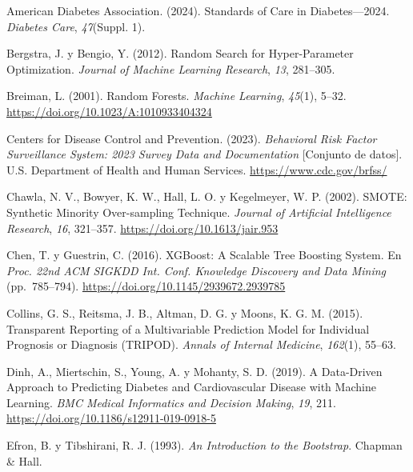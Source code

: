 \documentclass[conference,a4paper]{IEEEtran}
\begin{document}
\renewcommand{\refname}{Referencias}
\begin{thebibliography}{}
American Diabetes Association. (2024). Standards of Care in Diabetes---2024. \textit{Diabetes Care}, \textit{47}(Suppl. 1).

Bergstra, J. y Bengio, Y. (2012). Random Search for Hyper-Parameter Optimization. \textit{Journal of Machine Learning Research}, \textit{13}, 281–305.

Breiman, L. (2001). Random Forests. \textit{Machine Learning}, \textit{45}(1), 5–32. \url{https://doi.org/10.1023/A:1010933404324}

Centers for Disease Control and Prevention. (2023). \textit{Behavioral Risk Factor Surveillance System: 2023 Survey Data and Documentation} [Conjunto de datos]. U.S. Department of Health and Human Services. \url{https://www.cdc.gov/brfss/}

Chawla, N. V., Bowyer, K. W., Hall, L. O. y Kegelmeyer, W. P. (2002). {SMOTE}: Synthetic Minority Over-sampling Technique. \textit{Journal of Artificial Intelligence Research}, \textit{16}, 321–357. \url{https://doi.org/10.1613/jair.953}

Chen, T. y Guestrin, C. (2016). {XGBoost}: A Scalable Tree Boosting System. En \textit{Proc. 22nd ACM SIGKDD Int. Conf. Knowledge Discovery and Data Mining} (pp.~785–794). \url{https://doi.org/10.1145/2939672.2939785}

Collins, G. S., Reitsma, J. B., Altman, D. G. y Moons, K. G. M. (2015). Transparent Reporting of a Multivariable Prediction Model for Individual Prognosis or Diagnosis ({TRIPOD}). \textit{Annals of Internal Medicine}, \textit{162}(1), 55–63.

Dinh, A., Miertschin, S., Young, A. y Mohanty, S. D. (2019). A Data-Driven Approach to Predicting Diabetes and Cardiovascular Disease with Machine Learning. \textit{BMC Medical Informatics and Decision Making}, \textit{19}, 211. \url{https://doi.org/10.1186/s12911-019-0918-5}

Efron, B. y Tibshirani, R. J. (1993). \textit{An Introduction to the Bootstrap}. Chapman \& Hall.


\end{thebibliography}
\end{document}
